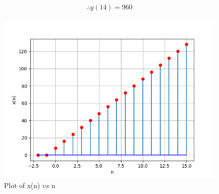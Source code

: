 \documentclass[journal,12pt,twocolumn]{IEEEtran}
\theoremstyle{remark}
\begin{document}
\begin{align}
    \therefore \boxed{y(14)=960}
\end{align}
\begin{figure}[ht]
        \centering
        \includegraphics[width=\columnwidth]{figs/a.png}
        \caption{Plot of x(n) $vs$ n}
        \label{fig:10.5.3.13.1}
    \end{figure}
\end{document}
